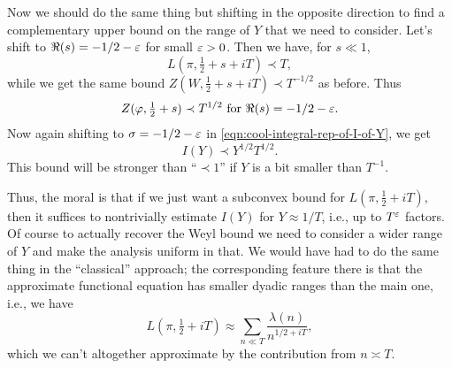 \documentclass[reqno]{amsart} 
\begin{document}
Now we should do the same thing but shifting in the opposite direction to find a complementary upper bound on the range of $Y$ that we need to consider.  Let's shift to $\Re(s) = -1/2 - \varepsilon$ for small $\varepsilon > 0$.  Then we have, for $s \ll 1$,
\begin{equation*}
  L(\pi, \tfrac{1}{2} + s + i T) \prec T,
\end{equation*}
while we get the same bound $Z(W, \tfrac{1}{2} + s + iT) \prec T^{-1/2}$ as before.  Thus 
\begin{equation*}
  Z(\varphi, \tfrac{1}{2} + s) \prec T^{1/2} \text{ for } \Re(s) = -1/2 - \varepsilon.
\end{equation*}
Now again shifting to $\sigma = -1/2 - \varepsilon$ in \eqref{eqn:cool-integral-rep-of-I-of-Y}, we get
\begin{equation*}
  I(Y) \prec Y ^{1/2} T ^{1/2}.
\end{equation*}
This bound will be stronger than ``$\prec 1$'' if $Y$ is a bit smaller than $T^{-1}$.

Thus, the moral is that if we just want a subconvex bound for $L(\pi,\tfrac{1}{2} + i T)$, then it suffices to nontrivially estimate $I(Y)$ for $Y \approx 1/T$, i.e., up to $T^\varepsilon$ factors.  Of course to actually recover the Weyl bound we need to consider a wider range of $Y$ and make the analysis uniform in that.  We would have had to do the same thing in the ``classical'' approach; the corresponding feature there is that the approximate functional equation has smaller dyadic ranges than the main one, i.e., we have
\begin{equation*}
  L(\pi, \tfrac{1}{2} + i T)
  \approx \sum _{n \ll T}
  \frac{\lambda(n) }{n ^{1/2 + i T}},
\end{equation*}
which we can't altogether approximate by the contribution from $n \asymp T$.
\end{document}
